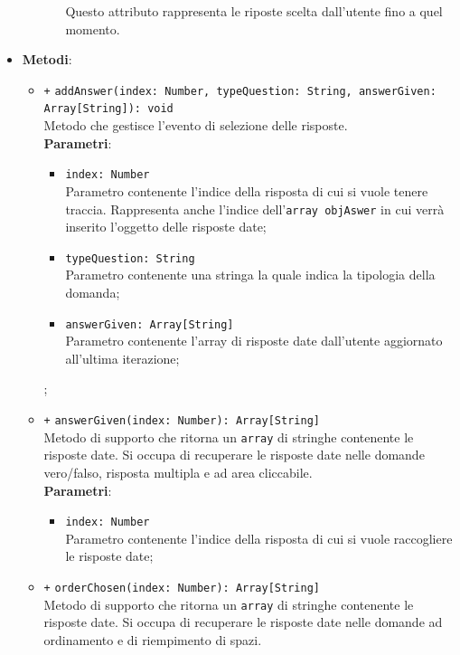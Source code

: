 \begin{itemize}
\begin{itemize}
\begin{itemize}
						Questo attributo rappresenta le riposte scelta dall'utente fino a quel momento.
					\end{itemize}
				\end{itemize}
				\item \textbf{Metodi}: 
				\begin{itemize}
					\item \texttt{+} \texttt{addAnswer(index: Number, typeQuestion: String, answerGiven: Array[String]): void} \\
					Metodo che gestisce l'evento di selezione delle risposte. \\
					\textbf{Parametri}:
					\begin{itemize}
						\item \texttt{index: Number} \\
						Parametro contenente l'indice della risposta di cui si vuole tenere traccia. Rappresenta anche l'indice dell'\texttt{array objAswer} in cui verrà inserito l'oggetto delle risposte date;
						\item \texttt{typeQuestion: String} \\
						Parametro contenente una stringa la quale indica la tipologia della domanda;
						\item \texttt{answerGiven: Array[String]} \\
						Parametro contenente l'array di risposte date dall'utente aggiornato all'ultima iterazione;
					\end{itemize};
					\item \texttt{+} \texttt{answerGiven(index: Number): Array[String]} \\
					Metodo di supporto che ritorna un \texttt{array} di stringhe contenente le risposte date. Si occupa di recuperare le risposte date nelle domande vero/falso, risposta multipla e ad area cliccabile.\\
					\textbf{Parametri}:
					\begin{itemize}
						\item \texttt{index: Number} \\
						Parametro contenente l'indice della risposta di cui si vuole raccogliere le risposte date; 
					\end{itemize}
					\item \texttt{+} \texttt{orderChosen(index: Number): Array[String]} \\
					Metodo di supporto che ritorna un \texttt{array} di stringhe contenente le risposte date. Si occupa di recuperare le risposte date nelle domande ad ordinamento e di riempimento di spazi.\\

\end{itemize}
\end{itemize}
